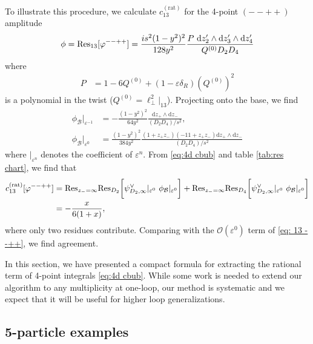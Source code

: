 \documentclass[11pt]{article}
\renewcommand{\d}{\text{d}}
\newcommand{\nn}{\nonumber}
\renewcommand{\O}{\mathcal{O}}
\newcommand{\B}{\mathcal{B}}
\newcommand{\res}{{\rm Res}}
\newcommand{\vphi}{\varphi}
\newcommand{\vep}{\varepsilon}
\begin{document}
To illustrate this procedure, we calculate $c_{13}^{(\text{rat})}$ for the 4-point $(--++)$ amplitude
\begin{align}
	\phi
	= \res_{13}[\vphi^{--++}] 
	= \frac{is^2 (1-y^2)^2}{128 y^2} 
	\frac{
		 P\ \d z_2^\prime \wedge \d z_3^\prime \wedge \d z_4^\prime
	}{
		 Q^{(0)} D_2 D_4
	}
\end{align}
where 
\begin{align}
	P &= 1 
		- 6 Q^{(0)}
		+ (1-\vep \delta_R) \left( Q^{(0)} \right)^2
\end{align}
is a polynomial in the twist ($Q^{(0)}=\ell_\perp^2\vert_{13}$). 
Projecting onto the base, we find
\begin{align}
	\phi_\B\vert_{\vep^{-1}}
	&= -\frac{ (1-y^2)^2}{64 y^2}  
		\frac{\d z_+ \wedge \d z_-}{(D_2 D_4)/s^2 },
	\\
	\phi_\B\vert_{\vep^{0} }
	&= \frac{ (1-y^2)^2}{384 y^2}  
		\frac{ (1+z_+z_-) (-11+z_+z_-) \d z_+ \wedge \d z_-}{(D_2 D_4)/s^2 }
\end{align}
where $\vert_{\vep^n}$ denotes the coefficient of $\vep^n$. 
From \eqref{eq:4d cbub} and table \ref{tab:res chart}, we find that 
\begin{align} \label{eq: 13 rat}
	c_{13}^{(\text{rat})}[\vphi^{--++}] 
	&= \res_{z_-=\infty}\res_{D_2}\bigg[
			\psi^\vee_{D_2,\infty}\vert_{\vep^{0} }\ \phi_\B\vert_{\vep^{0} }
		\bigg]
		+\res_{z_-=\infty}\res_{D_4}\bigg[
			\psi^\vee_{D_2,\infty}\vert_{\vep^{0} }\ \phi_\B\vert_{\vep^{0} }
		\bigg]
	\nn\\&
	= -\frac{x}{6(1+x)},
\end{align}
where only two residues contribute. 
Comparing with the $\O(\vep^0)$ term of \eqref{eq: 13 --++}, we find agreement. 

In this section, we have presented a compact formula for extracting the rational term of 4-point integrals \eqref{eq:4d cbub}. 
While some work is needed to extend our algorithm to any multiplicity at one-loop, our method is systematic and we expect that it will be useful for higher loop generalizations. 


\subsection{5-particle examples \label{sec:5ptGU}}
\end{document}
